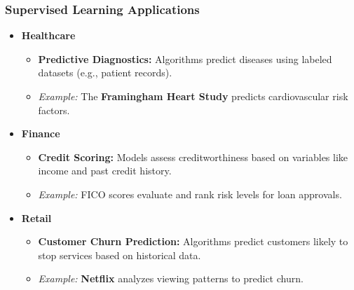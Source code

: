 \documentclass[aspectratio=169]{beamer}
\begin{document}
\begin{frame}[fragile]
    \frametitle{Supervised Learning Applications}
    \begin{itemize}
        \item \textbf{Healthcare}
        \begin{itemize}
            \item \textbf{Predictive Diagnostics:} Algorithms predict diseases using labeled datasets (e.g., patient records). 
            \item \textit{Example:} The \textbf{Framingham Heart Study} predicts cardiovascular risk factors.
        \end{itemize}
        
        \item \textbf{Finance}
        \begin{itemize}
            \item \textbf{Credit Scoring:} Models assess creditworthiness based on variables like income and past credit history.
            \item \textit{Example:} FICO scores evaluate and rank risk levels for loan approvals.
        \end{itemize}

        \item \textbf{Retail}
        \begin{itemize}
            \item \textbf{Customer Churn Prediction:} Algorithms predict customers likely to stop services based on historical data.
            \item \textit{Example:} \textbf{Netflix} analyzes viewing patterns to predict churn.
        \end{itemize}
    \end{itemize}
\end{frame}
\end{document}
